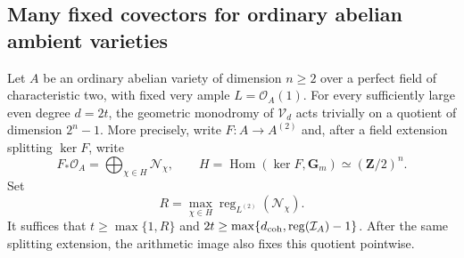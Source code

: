 \subsection{Many fixed covectors for ordinary abelian ambient varieties}
\label{subsec:ordinary-abelian-covectors}

\begin{proposition}\label{prop:ordinary-abelian-fixed-quotient}
Let $A$ be an ordinary abelian variety of dimension $n\geq2$
over a perfect field of characteristic two, with fixed very
ample $L=\mathcal O_A(1)$.  For every sufficiently large even
degree $d=2t$, the geometric monodromy of $\mathcal V_d$
acts trivially on a quotient of dimension $2^n-1$.
More precisely, write $F:A\to A^{(2)}$ and, after a field
extension splitting $\ker F$, write
\[
 F_*\mathcal O_A=\bigoplus_{\chi\in H}\mathcal N_\chi,
 \qquad H=\operatorname{Hom}(\ker F,\mathbf G_m)
                 \simeq(\mathbf Z/2)^n.
\]
Set
\[
 R=\max_{\chi\in H}
         \operatorname{reg}_{L^{(2)}}(\mathcal N_\chi).
\]
It suffices that $t\geq\max\{1,R\}$ and
$2t\geq\max\{d_{\rm coh},\operatorname{reg}(\mathcal I_A)-1\}$.
After the same splitting extension, the arithmetic image
also fixes this quotient pointwise.
\end{proposition}

